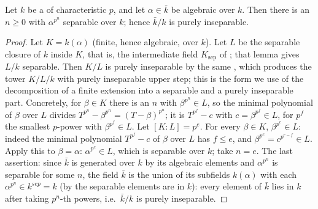 \begin{lemma}
\label{lem:pc-kbar-pure-insep}
Let $k$ be a 
of characteristic $p$, and let $\alpha\in\bar k$ be algebraic over $k$.
Then there is an $n\ge0$ with $\alpha^{p^n}$ separable over $k$; hence
$\bar k/k$ is purely inseparable.
\end{lemma}
\begin{proof}
Let $K=k(\alpha)$ (finite, hence algebraic, over $k$).  Let $L$ be the
separable closure of $k$ inside $K$, that is, the intermediate field
$K_{\mathrm{sep}}$ of
; that lemma gives
$L/k$ separable.
Then $K/L$ is purely inseparable by the same
, which produces the
tower $K/L/k$ with purely inseparable upper step; this is the form we
use of the decomposition of a finite extension into a separable and a
purely inseparable part.  Concretely, for $\beta\in K$ there is an $n$
with $\beta^{p^n}\in L$, so the minimal polynomial of $\beta$ over $L$
divides $T^{p^n}-\beta^{p^n}=(T-\beta)^{p^n}$; it is
$T^{p^f}-c$ with $c=\beta^{p^f}\in L$, for $p^f$ the smallest $p$-power
with $\beta^{p^f}\in L$.  Let
$[K:L]=p^e$.  For every $\beta\in K$, $\beta^{p^e}\in L$: indeed the
minimal polynomial $T^{p^f}-c$ of $\beta$ over $L$ has $f\le e$, and
$\beta^{p^e}=c^{p^{e-f}}\in L$.
Apply this to $\beta=\alpha$: $\alpha^{p^e}\in L$, which is separable
over $k$; take $n=e$.  The last assertion: since $\bar k$ is
generated over $k$ by its algebraic elements and $\alpha^{p^n}$ is
separable for some $n$, the field $\bar k$ is the union of its
subfields $k(\alpha)$ with each $\alpha^{p^n}\in k^{sep}=k$ (by
 the separable elements are
in $k$): every element of $\bar k$ lies in $k$ after taking
$p^n$-th powers, i.e.\ $\bar k/k$ is purely inseparable.
\end{proof}

